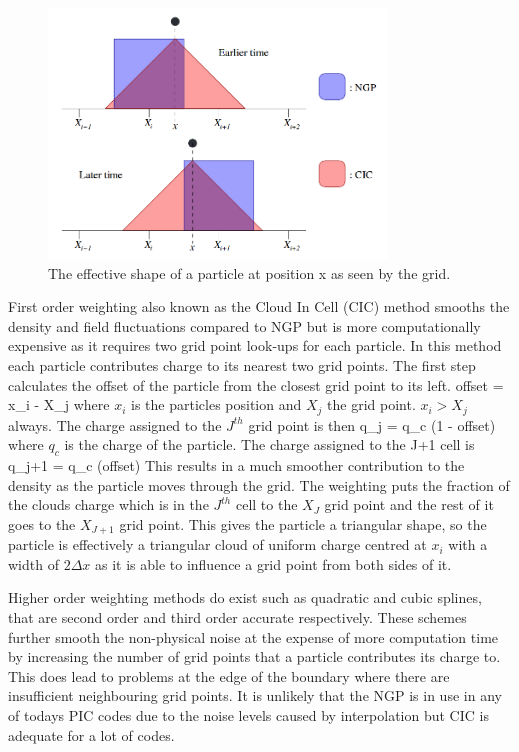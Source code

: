 \begin{figure}[H]
\centering
\includegraphics[width=0.8\textwidth]{particleshape}
\caption{The effective shape of a particle at position x as seen by the grid.\cite{shape}}
\label{fig:shape}
\end{figure}
First order weighting also known as the Cloud In Cell (CIC) method smooths the density and field fluctuations compared to NGP but is more computationally expensive as it requires two grid point look-ups for each particle. In this method each particle contributes charge to its nearest two grid points. The first step calculates the offset of the particle from the closest grid point to its left. 
\be
offset = x_i - X_j 
\ee 
where $x_i$ is the particles position and $X_j$ the grid point. $x_i > X_j$ always. The charge assigned to the $J^{th}$ grid point is then 
\be 
q_j = q_c \left(1 - offset\right)
\ee 
where $q_c$ is the charge of the particle. 
The charge assigned to the J+1 cell is 
\be 
q_{j+1} = q_c \left(offset\right)
\ee 
This results in a much smoother contribution to the density as the particle moves through the grid. The weighting puts the fraction of the clouds charge which is in the $J^{th}$ cell to the $X_J$ grid point and the rest of it goes to the $X_{J+1}$ grid point. This  gives the particle a triangular shape, so the particle is effectively a triangular cloud of uniform charge centred at $x_i$ with a width of $2\Delta x$ as it is able to influence a grid point from both sides of it. 

Higher order weighting methods do exist such as quadratic and cubic splines, that are second order and third order accurate respectively. These schemes further smooth the non-physical noise at the expense of more computation time by increasing the number of grid points that a particle contributes its charge to. This does lead to problems at the edge of the boundary where there are insufficient neighbouring grid points. It is unlikely that the NGP is in use in any of todays PIC codes due to the noise levels caused by interpolation but CIC is adequate for a lot of codes.

